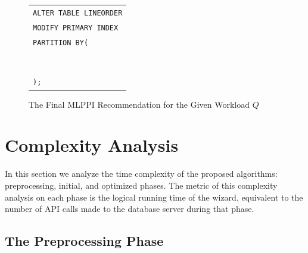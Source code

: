 \documentclass[runningheads]{comsis2}
\begin{document}
\vspace{-.25in}
\begin{figure}[h!]
\begin{center}
\begin{tabular}{|l|} \hline
{\tt ALTER TABLE LINEORDER} \\
{\tt MODIFY PRIMARY INDEX} \\
{\tt PARTITION BY(} \\
\hspace{.1in}{\tt CASE\_N(} \\
	\hspace{.2in}{\tt LO\_DISCOUNT $\geq$ 1 AND LO\_DISCOUNT $\leq$ 5,} \\
	\hspace{.2in}{\tt LO\_DISCOUNT $\geq$ 7,} \\ 
	\hspace{.2in}{\tt NO CASE OR UNKNOWN),} \\
\hspace{.1in}{\tt CASE\_N(} \\
	\hspace{.2in}{\tt LO\_QUANTITY $<$ 25,} \\
	\hspace{.2in}{\tt LO\_QUANTITY $\geq$ 25 AND LO\_QUANTITY $\leq$ 35,} \\
	\hspace{.2in}{\tt NO CASE OR UNKNOWN)} \\ 
{\tt );} \\ \hline
\end{tabular}
\end{center}
\vspace{-.2in}
\caption{The Final MLPPI Recommendation for the Given Workload $Q$\label{fig:mlppi}}
\vspace{-.2in}
\end{figure}

\section{Complexity Analysis}
\label{sec:analysis}

In this section we analyze the time complexity of 
the proposed algorithms: preprocessing, initial, and optimized phases. 
The metric of this complexity analysis on each phase is the logical running time of the wizard, 
equivalent to the number of API calls made to the database server during that phase. 

\subsection{The Preprocessing Phase}
\end{document}
